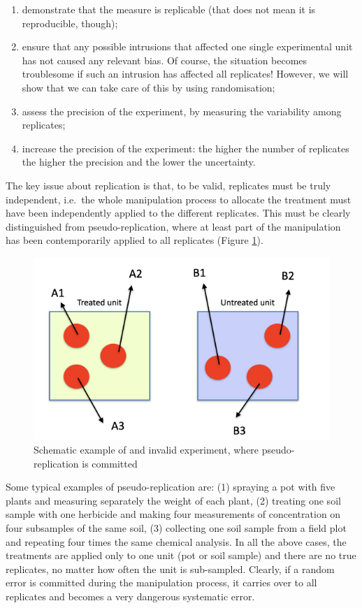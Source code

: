 \documentclass[a4paper,12pt,oneside]{book}
\providecommand{\tightlist}{%
  \setlength{\itemsep}{0pt}\setlength{\parskip}{0pt}}
\begin{document}
\begin{enumerate}
\def\labelenumi{\arabic{enumi}.}
\tightlist
\item
  demonstrate that the measure is replicable (that does not mean it is reproducible, though);
\item
  ensure that any possible intrusions that affected one single experimental unit has not caused any relevant bias. Of course, the situation becomes troublesome if such an intrusion has affected all replicates! However, we will show that we can take care of this by using randomisation;
\item
  assess the precision of the experiment, by measuring the variability among replicates;
\item
  increase the precision of the experiment: the higher the number of replicates the higher the precision and the lower the uncertainty.
\end{enumerate}

The key issue about replication is that, to be valid, replicates must be truly independent, i.e.~the whole manipulation process to allocate the treatment must have been independently applied to the different replicates. This must be clearly distinguished from pseudo-replication, where at least part of the manipulation has been contemporarily applied to all replicates (Figure \ref{fig:figName2b}).

\begin{figure}

{\centering \includegraphics[width=0.75\linewidth]{_images/PseudoReplication} 

}

\caption{Schematic example of and invalid experiment, where pseudo-replication is committed}\label{fig:figName2b}
\end{figure}

Some typical examples of pseudo-replication are: (1) spraying a pot with five plants and measuring separately the weight of each plant, (2) treating one soil sample with one herbicide and making four measurements of concentration on four subsamples of the same soil, (3) collecting one soil sample from a field plot and repeating four times the same chemical analysis. In all the above cases, the treatments are applied only to one unit (pot or soil sample) and there are no true replicates, no matter how often the unit is sub-sampled. Clearly, if a random error is committed during the manipulation process, it carries over to all replicates and becomes a very dangerous systematic error.
\end{document}
